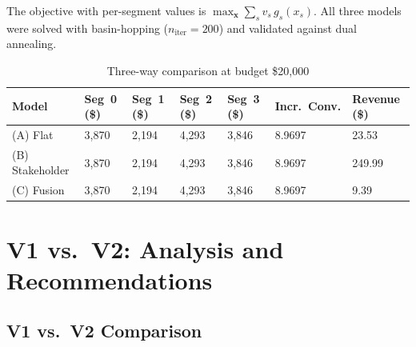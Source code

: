 \documentclass[11pt,letterpaper]{article}
\begin{document}
The objective with per-segment values is $\max_{\mathbf{x}} \sum_s v_s\,g_s(x_s)$.
All three models were solved with basin-hopping ($n_\text{iter} = 200$) and
validated against dual annealing.

\begin{table}[h!]
\centering
\caption{Three-way comparison at budget \$20{,}000}
\small
\begin{tabular}{L{2.8cm} R{1.5cm} R{1.5cm} R{1.5cm} R{1.5cm} R{1.8cm} R{1.6cm}}
\toprule
\textbf{Model} & \textbf{Seg~0 (\$)} & \textbf{Seg~1 (\$)} &
\textbf{Seg~2 (\$)} & \textbf{Seg~3 (\$)} &
\textbf{Incr.\ Conv.} & \textbf{Revenue (\$)} \\
\midrule
(A) Flat     & 3{,}870 & 2{,}194 & 4{,}293 & 3{,}846 & 8.9697 & 23.53 \\
(B) Stakeholder & 3{,}870 & 2{,}194 & 4{,}293 & 3{,}846 & 8.9697 & 249.99 \\
(C) Fusion   & 3{,}870 & 2{,}194 & 4{,}293 & 3{,}846 & 8.9697 &   9.39 \\
\bottomrule
\end{tabular}
\end{table}

\newpage

\section{V1 vs.\ V2: Analysis and Recommendations}

\subsection{V1 vs.\ V2 Comparison}
\end{document}
